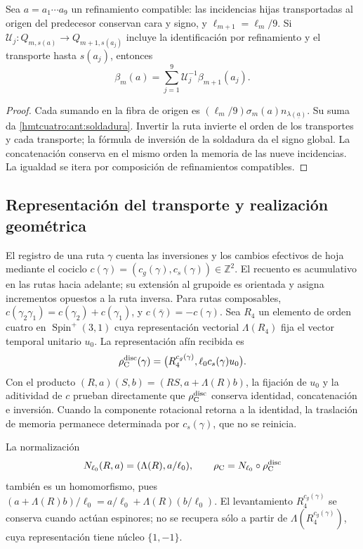 \begin{proposition}
\label{hmtcuatro:ant:refinamiento-soldadura}
Sea \(a=a_1\cdots a_9\) un refinamiento compatible: las incidencias
hijas transportadas al origen del predecesor conservan cara y signo,
y \(\ell_{m+1}=\ell_m/9\). Si
\(\mathcal U_j:Q_{m,s(a)}\to Q_{m+1,s(a_j)}\) incluye la
identificación por refinamiento y el transporte hasta \(s(a_j)\),
entonces
\[
 \beta_m(a)=\sum_{j=1}^9\mathcal U_j^{-1}\beta_{m+1}(a_j).
\]
\end{proposition}
\begin{proof}
Cada sumando en la fibra de origen es
\((\ell_m/9)\sigma_m(a)n_{\lambda(\underline a)}\). Su suma da
\eqref{hmtcuatro:ant:soldadura}. Invertir la ruta invierte el orden
de los transportes y cada transporte; la fórmula de inversión de
la soldadura da el signo global. La concatenación conserva en el
mismo orden la memoria de las nueve incidencias. La igualdad se
itera por composición de refinamientos compatibles.
\end{proof}

\subsection{Representación del transporte y realización geométrica}
\label{hmtcuatro:ant:geometria}

El registro de una ruta \(\gamma\) cuenta las inversiones y los
cambios efectivos de hoja mediante el cociclo
\(c(\gamma)=(c_g(\gamma),c_s(\gamma))\in\mathbb Z^2\).
El recuento es acumulativo en las rutas hacia adelante; su
extensión al grupoide es orientada y asigna incrementos opuestos
a la ruta inversa.
Para rutas composables,
\(c(\gamma_2\gamma_1)=c(\gamma_2)+c(\gamma_1)\), y
\(c(\bar\gamma)=-c(\gamma)\). Sea \(R_4\) un elemento de orden
cuatro en \(\operatorname{Spin}^+(3,1)\) cuya representación
vectorial \(\Lambda(R_4)\) fija el vector temporal unitario \(u_0\).
La representación afín recibida es
\[
 \rho_{\rm C}^{\rm disc}(\gamma)
 =\bigl(R_4^{c_g(\gamma)},\ell_0c_s(\gamma)u_0\bigr).
\]
Con el producto
\((R,a)(S,b)=(RS,a+\Lambda(R)b)\), la fijación de \(u_0\) y la
aditividad de \(c\) prueban directamente que \(\rho_{\rm C}^{\rm disc}\)
conserva identidad, concatenación e inversión. Cuando la componente
rotacional retorna a la identidad, la traslación de memoria permanece
determinada por \(c_s(\gamma)\), que no se reinicia.

La normalización
\[
 N_{\ell_0}(R,a)=(\Lambda(R),a/\ell_0),\qquad
 \rho_{\rm C}=N_{\ell_0}\circ\rho_{\rm C}^{\rm disc}
\]
también es un homomorfismo, pues
\((a+\Lambda(R)b)/\ell_0=a/\ell_0+\Lambda(R)(b/\ell_0)\).
El levantamiento \(R_4^{c_g(\gamma)}\) se conserva cuando actúan
espinores; no se recupera sólo a partir de \(\Lambda(R_4^{c_g(\gamma)})\),
cuya representación tiene núcleo \(\{1,-1\}\).

